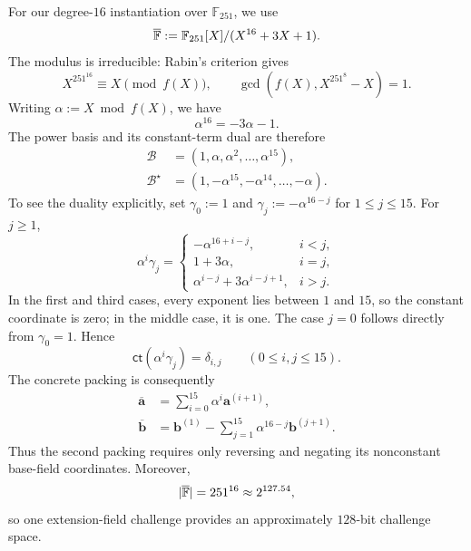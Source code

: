 \documentclass[runningheads]{llncs}
\begin{document}
For our degree-\(16\) instantiation over \(\mathbb F_{251}\), we use
\begin{equation}
    \overline{{\mathbb{F}}}
      :=\mathbb F_{251}[X]/(X^{16}+3X+1).
\label{eq:extension-concrete-field}
\end{equation}
The modulus is irreducible: Rabin's criterion gives
\[
    X^{251^{16}}\equiv X\pmod{f(X)},
    \qquad
    \gcd\!\left(f(X),X^{251^8}-X\right)=1.
\]
Writing \(\alpha:=X\bmod f(X)\), we have
\[
    \alpha^{16}=-3\alpha-1.
\]
The power basis and its constant-term dual are therefore
\begin{equation}
\begin{aligned}
    \mathcal B
      &=\left(1,\alpha,\alpha^2,\ldots,\alpha^{15}\right),\\
    \mathcal B^\star
      &=\left(1,-\alpha^{15},-\alpha^{14},\ldots,-\alpha\right).
\end{aligned}
\label{eq:extension-concrete-dual-basis}
\end{equation}
To see the duality explicitly, set
\(\gamma_0:=1\) and
\(\gamma_j:=-\alpha^{16-j}\) for \(1\leq j\leq15\).  For
\(j\geq1\),
\begin{equation}
    \alpha^i\gamma_j
      =
      \begin{cases}
        -\alpha^{16+i-j},
          & i<j,\\
        1+3\alpha,
          & i=j,\\
        \alpha^{i-j}+3\alpha^{i-j+1},
          & i>j.
      \end{cases}
\label{eq:extension-concrete-dual-cases}
\end{equation}
In the first and third cases, every exponent lies between \(1\) and
\(15\), so the constant coordinate is zero; in the middle case, it is
one.  The case \(j=0\) follows directly from \(\gamma_0=1\).  Hence
\[
    \mathsf{ct}(\alpha^i\gamma_j)=\delta_{i,j}
    \qquad(0\leq i,j\leq15).
\]
The concrete packing is consequently
\begin{equation}
\begin{aligned}
    \overline{\bm a}
      &=\sum_{i=0}^{15}\alpha^i\bm a^{(i+1)},\\
    \overline{\bm b}
      &=\bm b^{(1)}-
        \sum_{j=1}^{15}\alpha^{16-j}\bm b^{(j+1)}.
\end{aligned}
\label{eq:extension-concrete-packing}
\end{equation}
Thus the second packing requires only reversing and negating its
nonconstant base-field coordinates.  Moreover,
\[
    \lvert\overline{{\mathbb{F}}}\rvert
      =251^{16}\approx2^{127.54},
\]
so one extension-field challenge provides an approximately
\(128\)-bit challenge space.
\end{document}
